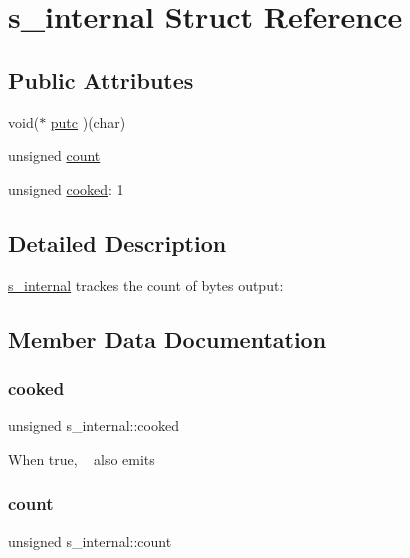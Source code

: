 \hypertarget{structs__internal}{}\section{s\+\_\+internal Struct Reference}
\label{structs__internal}
\subsection*{Public Attributes}
\begin{DoxyCompactItemize}
\item 
void($\ast$ \hyperlink{structs__internal_a046caf8bd89d8e15e72d1343200347ec}{putc} )(char)
\item 
unsigned \hyperlink{structs__internal_aa5f781ae7e2d8c24589aa3baa43eaeec}{count}
\item 
unsigned \hyperlink{structs__internal_a8b552ee95b8f39562944aa3b19de3a85}{cooked}\+: 1
\end{DoxyCompactItemize}


\subsection{Detailed Description}
\hyperlink{structs__internal}{s\+\_\+internal} trackes the count of bytes output\+: 

\subsection{Member Data Documentation}
\mbox{\label{structs__internal_a8b552ee95b8f39562944aa3b19de3a85}} 
\subsubsection{\texorpdfstring{cooked}{cooked}}
{\footnotesize\ttfamily unsigned s\+\_\+internal\+::cooked}

When true, \textquotesingle{}~\newline
\textquotesingle{} also emits \textquotesingle{}\textquotesingle{} \mbox{\label{structs__internal_aa5f781ae7e2d8c24589aa3baa43eaeec}} 
\subsubsection{\texorpdfstring{count}{count}}
{\footnotesize\ttfamily unsigned s\+\_\+internal\+::count}

